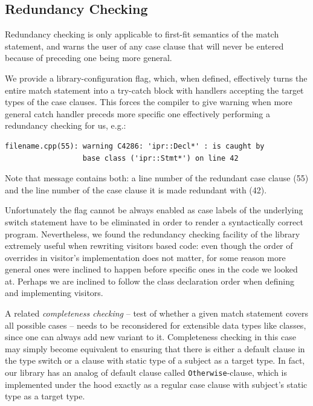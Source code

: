 \documentclass[preprint]{sigplanconf}
\makeatletter
\DeclareRobustCommand{\code}[1]{{\lstinline[breaklines=false,escapechar=@]{#1}}}
\makeatother
\begin{document}
\subsection{Redundancy Checking}
\label{sec:redun}

Redundancy checking is only applicable to first-fit semantics of the match 
statement, and warns the user of any case clause that will never be entered 
because of preceding one being more general.

We provide a library-configuration flag, which, when defined, effectively turns 
the entire match statement into a try-catch block with handlers accepting the 
target types of the case clauses. This forces the compiler to give warning when 
more general catch handler preceds more specific one effectively performing a 
redundancy checking for us, e.g.:

\begin{lstlisting}
filename.cpp(55): warning C4286: 'ipr::Decl*' : is caught by 
                  base class ('ipr::Stmt*') on line 42
\end{lstlisting}

\noindent
Note that message contains both: a line number of the redundant case clause (55) 
and the line number of the case clause it is made redundant with (42).

Unfortunately the flag cannot be always enabled as case labels of the underlying 
switch statement have to be eliminated in order to render a syntactically 
correct program. Nevertheless, we found the redundancy checking facility of the 
library extremely useful when rewriting visitors based code: even though the 
order of overrides in visitor's implementation does not matter, for some reason 
more general ones were inclined to happen before specific ones in the code we 
looked at. Perhaps we are inclined to follow the class declaration order when 
defining and implementing visitors.

A related \emph{completeness checking} -- test of whether a given match 
statement covers all possible cases -- needs to be reconsidered for extensible 
data types like classes, since one can always add new variant to it. 
Completeness checking in this case may simply become equivalent to ensuring that 
there is either a default clause in the type switch or a clause with static type 
of a subject as a target type. In fact, our library has an analog of default 
clause called \code{Otherwise}-clause, which is implemented under the hood 
exactly as a regular case clause with subject's static type as a target type.
\end{document}
